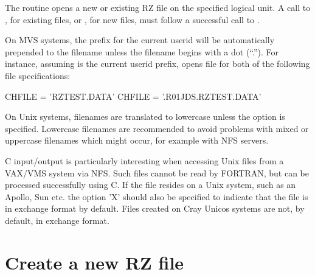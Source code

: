 The  routine opens a new or existing RZ file
on the specified logical unit. A call to , for
existing files, or , for new files, must follow
a successful call to .

On MVS systems, the prefix for the current userid
will be automatically prepended to the filename
unless the filename begins with a dot (``.'').
For instance, assuming  is the current userid prefix,
 opens file  for both of the following 
file specifications:
\begin{XMP}
      CHFILE = 'RZTEST.DATA'
      CHFILE = '.R01JDS.RZTEST.DATA'
\end{XMP}

On Unix systems, filenames are translated to lowercase
unless the  option is specified. 
Lowercase filenames
are recommended to avoid problems with mixed or uppercase
filenames which might occur, for example with NFS servers.

C input/output is particularly interesting when accessing Unix
files from a VAX/VMS system via NFS. Such files cannot
be read by FORTRAN, but can be processed successfully
using C. If the file resides on a Unix system, such
as an Apollo, Sun etc. the option 'X' should also be
specified to indicate that the file is in exchange format
by default. Files created on Cray Unicos systems are not,
by default, in exchange format.

\section{Create a new RZ file}

